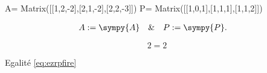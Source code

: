A= Matrix({[}{[}1,2,-2{]},{[}2,1,-2{]},{[}2,2,-3{]}{]}) P=
Matrix({[}{[}1,0,1{]},{[}1,1,1{]},{[}1,1,2{]}{]})

\[\begin{aligned}
\label{eq:ezrpfire}
&A:=  \sympy{A}&
& \& & 
&P:=  \sympy{P}.&
\end{aligned}\]

\[2=2\]

Egalité \protect\hyperlink{eq:ezrpfire}{{[}eq:ezrpfire{]}}
